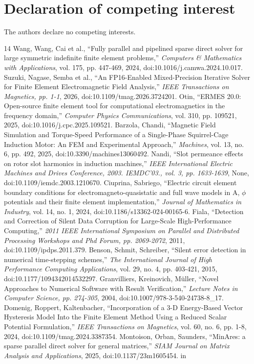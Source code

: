 \documentclass[preprint,12pt]{elsarticle}
\begin{document}
\section*{Declaration of competing interest}
The authors declare no competing interests.
\begin{thebibliography}{14}
 Wang, Wang, Cai et al., ``Fully parallel and pipelined sparse direct solver for large symmetric indefinite finite element problems,'' \emph{Computers \& Mathematics with Applications}, vol. 175, pp. 447-469, 2024, doi:10.1016/j.camwa.2024.10.017.
 Suzuki, Nagase, Semba et al., ``An FP16-Enabled Mixed-Precision Iterative Solver for Finite Element Electromagnetic Field Analysis,'' \emph{IEEE Transactions on Magnetics, pp. 1-1}, 2026, doi:10.1109/tmag.2026.3724201.
 Otin, ``ERMES 20.0: Open-source finite element tool for computational electromagnetics in the frequency domain,'' \emph{Computer Physics Communications}, vol. 310, pp. 109521, 2025, doi:10.1016/j.cpc.2025.109521.
 Barzola, Chandi, ``Magnetic Field Simulation and Torque-Speed Performance of a Single-Phase Squirrel-Cage Induction Motor: An FEM and Experimental Approach,'' \emph{Machines}, vol. 13, no. 6, pp. 492, 2025, doi:10.3390/machines13060492.
 Nandi, ``Slot permeance effects on rotor slot harmonics in induction machines,'' \emph{IEEE International Electric Machines and Drives Conference, 2003. IEMDC'03., vol. 3, pp. 1633-1639}, None, doi:10.1109/iemdc.2003.1210670.
 Ciuprina, Sabriego, ``Electric circuit element boundary conditions for electromagneto-quasistatic and full wave models in A, $\phi$ potentials and their finite element implementation,'' \emph{Journal of Mathematics in Industry}, vol. 14, no. 1, 2024, doi:10.1186/s13362-024-00165-6.
 Fiala, ``Detection and Correction of Silent Data Corruption for Large-Scale High-Performance Computing,'' \emph{2011 IEEE International Symposium on Parallel and Distributed Processing Workshops and Phd Forum, pp. 2069-2072}, 2011, doi:10.1109/ipdps.2011.379.
 Benson, Schmit, Schreiber, ``Silent error detection in numerical time-stepping schemes,'' \emph{The International Journal of High Performance Computing Applications}, vol. 29, no. 4, pp. 403-421, 2015, doi:10.1177/1094342014532297.
 Granvilliers, Kreinovich, Müller, ``Novel Approaches to Numerical Software with Result Verification,'' \emph{Lecture Notes in Computer Science, pp. 274-305}, 2004, doi:10.1007/978-3-540-24738-8\_17.
 Domenig, Roppert, Kaltenbacher, ``Incorporation of a 3-D Energy-Based Vector Hysteresis Model Into the Finite Element Method Using a Reduced Scalar Potential Formulation,'' \emph{IEEE Transactions on Magnetics}, vol. 60, no. 6, pp. 1-8, 2024, doi:10.1109/tmag.2024.3387354.
 Montoison, Orban, Saunders, ``MinAres: a sparse parallel direct solver for general matrices,'' \emph{SIAM Journal on Matrix Analysis and Applications}, 2025, doi:10.1137/23m1605454.
 in
\end{thebibliography}
\end{document}
